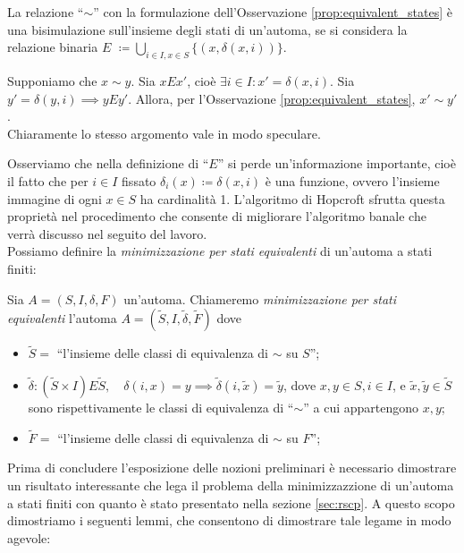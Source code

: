 \begin{proposition}
    La relazione ``$\sim$'' con la formulazione dell'Osservazione \ref{prop:equivalent_states} è una bisimulazione sull'insieme degli stati di un'automa, se si considera la relazione binaria $\displaystyle E \,\,\coloneqq \bigcup_{i \in I, x \in S} \{(x,\delta(x,i))\}$.
\end{proposition}
\begin{proof2}
    Supponiamo che $x \sim y$. Sia $x E x'$, cioè $\exists i \in I : x' = \delta(x,i)$. Sia $y' = \delta(y,i) \implies y E y'$. Allora, per l'Osservazione \ref{prop:equivalent_states}, $x' \sim y'$.\\
    Chiaramente lo stesso argomento vale in modo speculare.
\end{proof2}
Osserviamo che nella definizione di ``$E$'' si perde un'informazione importante, cioè il fatto che per $i \in I$ fissato $\delta_i(x) \coloneqq \delta(x,i)$ è una funzione, ovvero l'insieme immagine di ogni $x \in S$ ha cardinalità 1. L'algoritmo di Hopcroft sfrutta questa proprietà nel procedimento che consente di migliorare l'algoritmo banale che verrà discusso nel seguito del lavoro.\\
Possiamo definire la \emph{minimizzazione per stati equivalenti} di un'automa a stati finiti:
\begin{definition}\label{def:minim_eq_states}
    Sia $A = (S,I,\delta,F)$ un'automa. Chiameremo \emph{minimizzazione per stati equivalenti} l'automa $A = (\widetilde{S}, I, \widetilde{\delta}, \widetilde{F})$ dove
    \begin{itemize}
        \item $\widetilde{S} =$ ``l'insieme delle classi di equivalenza di $\sim$ su $S$'';
        \item $\widetilde{\delta} : (\widetilde{S} \times I) E \widetilde{S}, \quad \delta(i, x) = y \implies \widetilde{\delta}(i,\widetilde{x}) = \widetilde{y}$, dove $x,y \in S, i \in I$, e $\widetilde{x}, \widetilde{y} \in \widetilde{S}$ sono rispettivamente le classi di equivalenza di ``$\sim$'' a cui appartengono $x,y$;
        \item $\widetilde{F} =$ ``l'insieme delle classi di equivalenza di $\sim$ su $F$'';
    \end{itemize}
\end{definition}
Prima di concludere l'esposizione delle nozioni preliminari è necessario dimostrare un risultato interessante che lega il problema della minimizzazzione di un'automa a stati finiti con quanto è stato presentato nella sezione \ref{sec:rscp}. A questo scopo dimostriamo i seguenti lemmi, che consentono di dimostrare tale legame in modo agevole:
